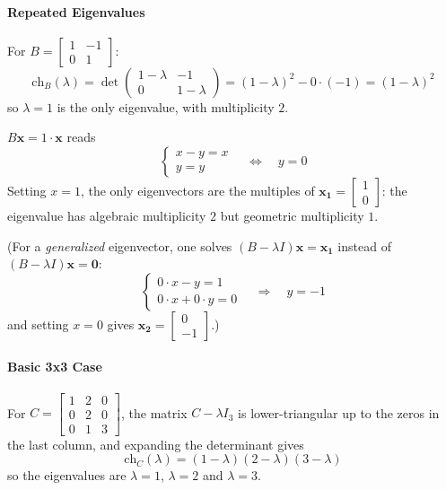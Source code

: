 \documentclass[]{article}
\begin{document}
	\paragraph{Repeated Eigenvalues}\mbox{}

	For $B = \begin{bmatrix} 1 & -1 \\ 0 & 1 \end{bmatrix}$:
	$$\mathrm{ch}_B(\lambda) = \det\begin{pmatrix} 1 - \lambda & -1 \\ 0 & 1 - \lambda \end{pmatrix} = (1-\lambda)^2 - 0 \cdot (-1) = (1 - \lambda)^2$$
	so $\lambda = 1$ is the only eigenvalue, with multiplicity $2$.

	$B \mathbf{x} = 1 \cdot \mathbf{x}$ reads
	$$\begin{cases} x - y = x \\ y = y \end{cases} \quad \Longleftrightarrow \quad y = 0$$
	Setting $x = 1$, the only eigenvectors are the multiples of $\mathbf{x_1} = \begin{bmatrix} 1 \\ 0 \end{bmatrix}$: the eigenvalue has algebraic multiplicity $2$ but geometric multiplicity $1$.

	(For a \textit{generalized} eigenvector, one solves $(B - \lambda I)\mathbf{x} = \mathbf{x_1}$ instead of $(B - \lambda I)\mathbf{x} = \mathbf{0}$:
	$$\begin{cases} 0 \cdot x - y = 1 \\ 0 \cdot x + 0 \cdot y = 0 \end{cases} \quad \Longrightarrow \quad y = -1$$
	and setting $x = 0$ gives $\mathbf{x_2} = \begin{bmatrix} 0 \\ -1 \end{bmatrix}$.)

	\paragraph{Basic 3x3 Case}\mbox{}

	For $C = \begin{bmatrix} 1 & 2 & 0 \\ 0 & 2 & 0 \\ 0 & 1 & 3 \end{bmatrix}$, the matrix $C - \lambda I_3$ is lower-triangular up to the zeros in the last column, and expanding the determinant gives
	$$\mathrm{ch}_C(\lambda) = (1 - \lambda)(2 - \lambda)(3 - \lambda)$$
	so the eigenvalues are $\lambda = 1$, $\lambda = 2$ and $\lambda = 3$.
\end{document}
